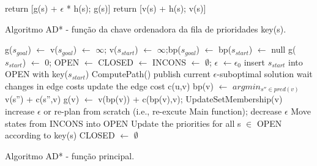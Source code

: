 \begin{algorithm}[H]
\SetAlgoLined
{
	return [g(s) + $\epsilon$ * h(s); g(s)]\;
}
{
	return [v(s) + h(s); v(s)]\;
}
\caption{Algoritmo AD* - função da chave ordenadora da fila de prioridades key(s).}
\end{algorithm}

\newpage
\begin{algorithm}[H]
\SetAlgoLined
g($s_{goal}$) $\leftarrow$ v($s_{goal}$) $\leftarrow$ $\infty$; v($s_{start}$) $\leftarrow$ $\infty$;bp($s_{goal}$) $\leftarrow$ bp($s_{start}$) $\leftarrow$ null\;
g($s_{start}$) $\leftarrow$ 0; OPEN $\leftarrow$ CLOSED $\leftarrow$ INCONS $\leftarrow$ $\emptyset$; $\epsilon$ $\leftarrow \epsilon_{0}$\;
insert $s_{start}$ into OPEN with key($s_{start}$)\;
{
	ComputePath()\;
	publish current $\epsilon$-suboptimal solution\;
	{
		wait changes in edge costs\;
	}
	{
		update the edge cost c(u,v)\;
		{
			bp(v) $\leftarrow$ $argmin_{s'' \in pred(v)}$ v(s'') + c(s'',v)\;
			g(v) $\leftarrow$ v(bp(v)) + c(bp(v),v); UpdateSetMembership(v)\;
		}
	}
	{
		increase $\epsilon$ or re-plan from scratch (i.e., re-excute Main function);
	}
	{
		{
			decrease $\epsilon$\;
		}
	}
		Move states from INCONS into OPEN\;
		Update the priorities for all s $\in$ OPEN according to key(s)\;
		CLOSED $\leftarrow$ $\emptyset$\;
}
		
\caption{Algoritmo AD* - função principal.}
\end{algorithm}


